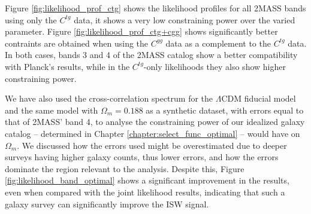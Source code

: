 \documentclass[openany,a4paper,12pt,oneside]{book}
\begin{document}
\begin{spacing}{1.5}
Figure \ref{fig:likelihood_prof_ctg} shows the likelihood profiles for all 2MASS bands using only the $C^{tg}$ data, it shows a very low constraining power over the varied parameter. Figure \ref{fig:likelihood_prof_ctg+cgg} shows significantly better contraints are obtained when using the $C^{gg}$ data as a complement to the $C^{tg}$ data. In both cases, bands 3 and 4 of the 2MASS catalog show a better compatibility with Planck's results, while in the $C^{tg}$-only likelihoods they also show higher constraining power.




We have also used the cross-correlation spectrum for the $\Lambda$CDM fiducial model and the same model with $\Omega_m=0.188$ as a synthetic dataset, with errors equal to that of 2MASS' band 4, to analyse the constraining power of our idealized galaxy catalog -- determined in Chapter \ref{chapter:select_func_optimal} -- would have on $\Omega_m$. We discussed how the errors used might be overestimated due to deeper surveys having higher galaxy counts, thus lower errors, and how the errors dominate the region relevant to the analysis. Despite this, Figure \ref{fig:likelihood_band_optimal} shows a significant improvement in the results, even when compared with the joint likelihood results, indicating that such a galaxy survey can significantly improve the ISW signal.


\end{spacing}
\end{document}
